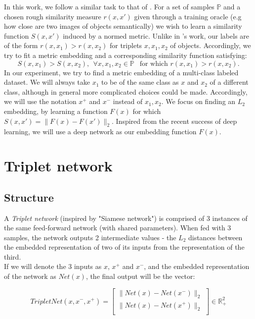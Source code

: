 \documentclass{article} %
\begin{document}
In this work, we follow a similar task to that of \citet{chechik2010large}. For a set of samples $\mathbb{P}$ and a chosen rough similarity measure $r(x,x')$ given through a training oracle
(e.g how close are two images of objects semantically) we wish to learn a similarity function $S(x,x')$ induced by a normed metric.
Unlike in \citet{chechik2010large}'s work, our labels are of the form $r(x,x_1)>r(x,x_2)$ for triplets $x,x_1,x_2$ of objects.
Accordingly, we try to fit a metric embedding and a corresponding similarity function satisfying:
$$ S(x,x_1)>S(x,x_2), \ \ \forall x,x_1,x_2 \in \mathbb{P} \ \ \text{ for which } r(x,x_1)>r(x,x_2).$$
In our experiment, we try to find a metric embedding of a multi-class labeled dataset. We will always take $x_1$ to be of the same class as $x$ and $x_2$ of a different class, although in general more complicated choices could be made.
Accordingly, we will use the notation $x^{+}$ and $x^{-}$ instead of $x_1, x_2$.
We focus on finding an $L_2$ embedding, by learning a function $F(x)$ for which $S(x,x')=\|F(x)-F(x')\|_2$.
Inspired from the recent success of deep learning, we will use a deep network as our embedding function $F(x)$.

\section{Triplet network}
\subsection{Structure}
A \emph{Triplet network} (inspired by "Siamese network") is comprised of 3 instances of the same feed-forward network (with shared parameters).
When fed with 3 samples, the network
outputs 2 intermediate values - the $L_2$ distances between the embedded representation of two of its inputs from the representation of the third. \\
If we will denote the 3 inputs as $x$, $x^{+}$ and $x^{-}$, and the
embedded representation of the network as $Net(x)$, the final output will be the vector:

\begin{equation*}
    TripletNet(x,x^{-},x^{+})= \begin{bmatrix}
                       \|Net(x)-Net(x^{-})\|_2 \\[0.3em]
                      \|Net(x)-Net(x^{+})\|_2 \\

                      \end{bmatrix} \in \mathbb{R}_{+}^2
\end{equation*}
\end{document}
